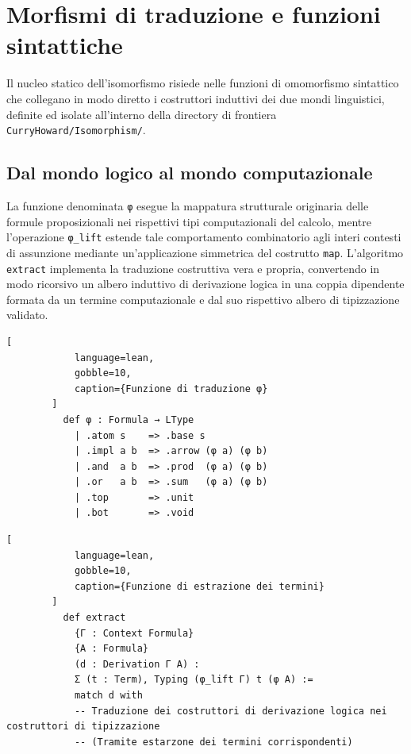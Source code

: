 \section{Morfismi di traduzione e funzioni sintattiche}
Il nucleo statico dell'isomorfismo risiede nelle funzioni di omomorfismo sintattico che collegano in modo diretto i costruttori induttivi dei due mondi linguistici, definite ed isolate all'interno della directory di frontiera \texttt{CurryHoward/Isomorphism/}.

\subsection{Dal mondo logico al mondo computazionale}
La funzione denominata \texttt{φ} esegue la mappatura strutturale originaria delle formule proposizionali nei rispettivi tipi computazionali del calcolo, mentre l'operazione \texttt{φ\_lift} estende tale comportamento combinatorio agli interi contesti di 
assunzione mediante un'applicazione simmetrica del costrutto \texttt{map}. L'algoritmo \texttt{extract} implementa la traduzione costruttiva vera e propria, convertendo in modo ricorsivo un albero induttivo di derivazione logica in una coppia dipendente 
formata da un termine computazionale e dal suo rispettivo albero di tipizzazione validato.
\begin{center}
    \begin{minipage}{\textwidth}
        \begin{lstlisting}[
            language=lean, 
            gobble=10,
            caption={Funzione di traduzione φ}
        ]
          def φ : Formula → LType
            | .atom s    => .base s
            | .impl a b  => .arrow (φ a) (φ b)
            | .and  a b  => .prod  (φ a) (φ b)
            | .or   a b  => .sum   (φ a) (φ b)
            | .top       => .unit
            | .bot       => .void
        \end{lstlisting}
    \end{minipage}
\end{center}

\begin{center}
    \begin{minipage}{\textwidth}
        \begin{lstlisting}[
            language=lean, 
            gobble=10,
            caption={Funzione di estrazione dei termini}
        ]
          def extract 
            {Γ : Context Formula} 
            {A : Formula} 
            (d : Derivation Γ A) : 
            Σ (t : Term), Typing (φ_lift Γ) t (φ A) :=
            match d with
            -- Traduzione dei costruttori di derivazione logica nei costruttori di tipizzazione
            -- (Tramite estarzone dei termini corrispondenti)
        \end{lstlisting}
    \end{minipage}
\end{center}

